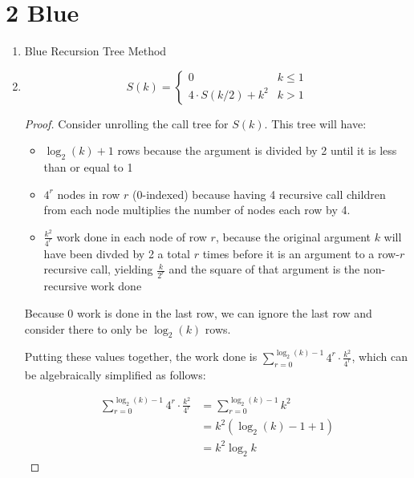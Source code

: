 \documentclass[10pt]{article}
\begin{document}
\section*{2 \quad Blue}

\begin{enumerate}[label={}]
      \item Blue Recursion Tree Method
      \item $$
                  S(k)= \begin{cases}0 & k \leq 1 \\ 4 \cdot S(k / 2)+k^2 & k>1\end{cases}
            $$

            \begin{proof}
                  Consider unrolling the call tree for $S(k)$. This tree will have:
                  \begin{itemize}
                        \item $\log _2(k)+1$ rows because the argument is divided by 2 until it is less than or equal to 1
                        \item $4^r$ nodes in row $r$ (0-indexed) because having 4 recursive call children from each node multiplies the number of nodes each row by 4.
                        \item $\frac{k^2}{4^r}$ work done in each node of row $r$, because the original argument $k$ will have been divded by 2 a total $r$ times before it is an argument to a row-$r$ recursive call, yielding $\frac{k}{2^r}$ and the square of that argument is the non-recursive work done
                  \end{itemize}
                  Because 0 work is done in the last row, we can ignore the last row and consider there to only be $\log _2(k)$ rows.

                  Putting these values together, the work done is $\sum_{r=0}^{\log _2(k)-1} 4^r \cdot \frac{k^2}{4^r}$, which can be algebraically simplified as follows:

                  $$
                        \begin{aligned}
                              \sum_{r=0}^{\log _2 (k)-1} 4^r \cdot \frac{k^2}{4^r} & =\sum_{r=0}^{\log _2 (k)-1}k^2   \\
                                                                                   & =k^2\left(\log _2 (k)-1+1\right) \\
                                                                                   & =k^2 \log _2 k
                        \end{aligned}
                  $$



\end{proof}
\end{enumerate}
\end{document}
